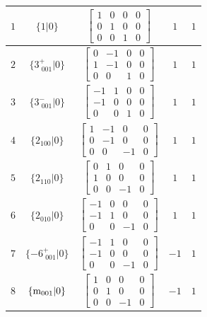 \documentclass[fleqn,8pt]{jsarticle}
\begin{document}
\begin{longtable}{ccccc}
$ 1 $ & $ \{1|0\} $ & $ \begin{bmatrix} 1 & 0 & 0 & 0 \\ 0 & 1 & 0 & 0 \\ 0 & 0 & 1 & 0 \end{bmatrix} $ & $ 1 $ & $ 1 $ \\ \hline
$ 2 $ & $ \{3^{+}_{\,\,001}|0\} $ & $ \begin{bmatrix} 0 & -1 & 0 & 0 \\ 1 & -1 & 0 & 0 \\ 0 & 0 & 1 & 0 \end{bmatrix} $ & $ 1 $ & $ 1 $ \\ \hline
$ 3 $ & $ \{3^{-}_{\,\,001}|0\} $ & $ \begin{bmatrix} -1 & 1 & 0 & 0 \\ -1 & 0 & 0 & 0 \\ 0 & 0 & 1 & 0 \end{bmatrix} $ & $ 1 $ & $ 1 $ \\ \hline
$ 4 $ & $ \{2{}_{100}|0\} $ & $ \begin{bmatrix} 1 & -1 & 0 & 0 \\ 0 & -1 & 0 & 0 \\ 0 & 0 & -1 & 0 \end{bmatrix} $ & $ 1 $ & $ 1 $ \\ \hline
$ 5 $ & $ \{2{}_{110}|0\} $ & $ \begin{bmatrix} 0 & 1 & 0 & 0 \\ 1 & 0 & 0 & 0 \\ 0 & 0 & -1 & 0 \end{bmatrix} $ & $ 1 $ & $ 1 $ \\ \hline
$ 6 $ & $ \{2{}_{010}|0\} $ & $ \begin{bmatrix} -1 & 0 & 0 & 0 \\ -1 & 1 & 0 & 0 \\ 0 & 0 & -1 & 0 \end{bmatrix} $ & $ 1 $ & $ 1 $ \\ \hline
$ 7 $ & $ \{-6^{+}_{\,\,001}|0\} $ & $ \begin{bmatrix} -1 & 1 & 0 & 0 \\ -1 & 0 & 0 & 0 \\ 0 & 0 & -1 & 0 \end{bmatrix} $ & $ -1 $ & $ 1 $ \\ \hline
$ 8 $ & $ \{{\rm m}_{001}|0\} $ & $ \begin{bmatrix} 1 & 0 & 0 & 0 \\ 0 & 1 & 0 & 0 \\ 0 & 0 & -1 & 0 \end{bmatrix} $ & $ -1 $ & $ 1 $ \\ \hline

\end{longtable}
\end{document}
